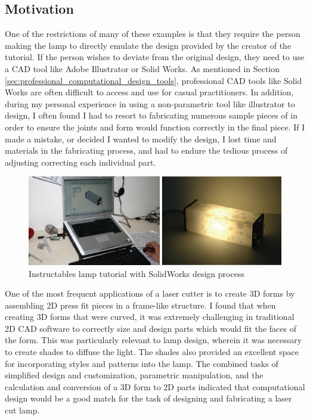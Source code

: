\subsection{Motivation}
One of the restrictions of many of these examples is that they require the person making the lamp to directly emulate the design provided by the creator of the tutorial. If the person wishes to deviate from the original design, they  need to use a CAD tool like Adobe Illustrator or Solid Works\cite{instructables_lamp_1}. As mentioned in Section \ref{sec:professional_computational_design_tools}, professional CAD tools like Solid Works are often difficult to access and use for casual practitioners. In addition, during my personal experience in using a non-parametric tool like illustrator to design, I often found I had to resort to fabricating numerous sample pieces of in order to ensure the joints and form would function correctly in the final piece. If I made a mistake, or decided I wanted to modify the design, I lost time and materials in the fabricating process, and had to endure the tedious process of adjusting correcting each individual part. 
\begin{center}
\begin{figure}[h!]
\includegraphics[width=6.5in]{images/solidworks_lamp.png}
\caption{Instructables lamp tutorial with SolidWorks design process}
\end{figure}
\end{center}
One of the most frequent applications of a laser cutter is to create 3D forms by assembling 2D press fit pieces in a frame-like structure. I found that when creating 3D forms that were curved, it was extremely challenging in traditional 2D CAD software to correctly size and design parts which would fit the faces of the form. This was particularly relevant to lamp design, wherein it was necessary to create shades to diffuse the light. The shades also provided an excellent space for incorporating styles and patterns into the lamp. The combined tasks of simplified design and customization, parametric manipulation, and the calculation and conversion of a 3D form to 2D parts indicated that computational design would be a good match for the task of designing and fabricating a laser cut lamp. 
	
